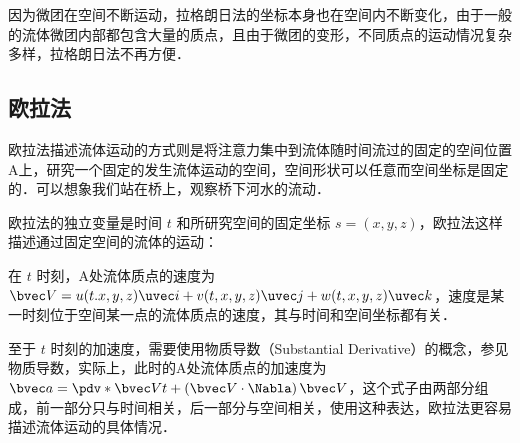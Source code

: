 因为微团在空间不断运动，拉格朗日法的坐标本身也在空间内不断变化，由于一般的流体微团内部都包含大量的质点，且由于微团的变形，不同质点的运动情况复杂多样，拉格朗日法不再方便．

\subsection{欧拉法}
欧拉法描述流体运动的方式则是将注意力集中到流体随时间流过的固定的空间位置A上，研究一个固定的发生流体运动的空间，空间形状可以任意而空间坐标是固定的．可以想象我们站在桥上，观察桥下河水的流动．

欧拉法的独立变量是时间 $t$ 和所研究空间的固定坐标 $s=(x,y,z)$，欧拉法这样描述通过固定空间的流体的运动：

在 $t$ 时刻，A处流体质点的速度为 $\bvec V=u(t.x,y,z)\uvec i+v(t,x,y,z)\uvec j+w(t,x,y,z)\uvec k$，速度是某一时刻位于空间某一点的流体质点的速度，其与时间和空间坐标都有关．

至于 $t$ 时刻的加速度，需要使用物质导数（Substantial  Derivative）的概念，参见物质导数，实际上，此时的A处流体质点的加速度为 $\bvec a=\pdv*{\bvec V}{t}+\left ( \bvec V\cdot \Nabla \right )\bvec V$，这个式子由两部分组成，前一部分只与时间相关，后一部分与空间相关，使用这种表达，欧拉法更容易描述流体运动的具体情况．
